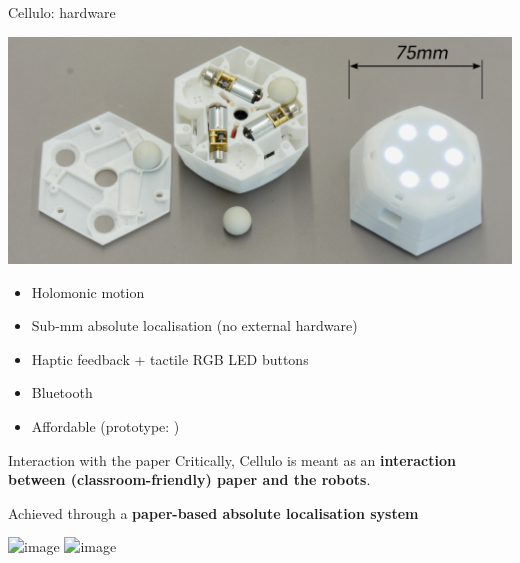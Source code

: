 \documentclass[compress]{beamer}
\begin{document}
 \begin{frame}{Cellulo: hardware}
     \begin{center}
         \includegraphics[width=0.8\linewidth]{cellulo/hardware-design}
     \end{center}
     \begin{itemize}
         \item Holomonic motion
         \item Sub-mm absolute localisation (no external hardware)
         \item Haptic feedback + tactile RGB LED buttons 
         \item Bluetooth
         \item<2> Affordable (prototype: )
     \end{itemize}
 \end{frame}




{
 \begin{frame}{Interaction with the paper}
     Critically, Cellulo is meant as an {\bf interaction between
     (classroom-friendly) paper and the robots}.

     \pause

     Achieved through a {\bf paper-based absolute localisation system}

     \begin{center}
         \includegraphics<3>[width=0.8\linewidth]{cellulo/treasure-game-1}
         \includegraphics<4>[width=\linewidth]{cellulo/treasure-game-2}
     \end{center}


 \end{frame}
}
\end{document}
